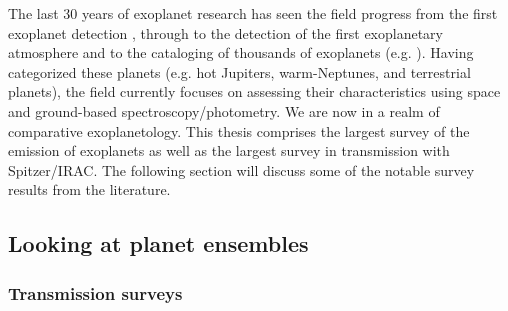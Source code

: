 The last 30 years of exoplanet research has seen the field progress from the first exoplanet detection \citep{Mayor1995}, through to the detection of the first exoplanetary atmosphere \citep{Charbonneau2002} and to the cataloging of thousands of exoplanets (e.g. \citet{Borucki2010, Batalha2013}). Having categorized these planets (e.g. hot Jupiters, warm-Neptunes, and terrestrial planets), the field currently focuses on assessing their characteristics using space and ground-based spectroscopy/photometry. We are now in a realm of comparative exoplanetology. This thesis comprises the largest survey of the emission of exoplanets as well as the largest survey in transmission with Spitzer/IRAC. The following section will discuss some of the notable survey results from the literature.



\subsection{Looking at planet ensembles}


\subsubsection{Transmission surveys}


